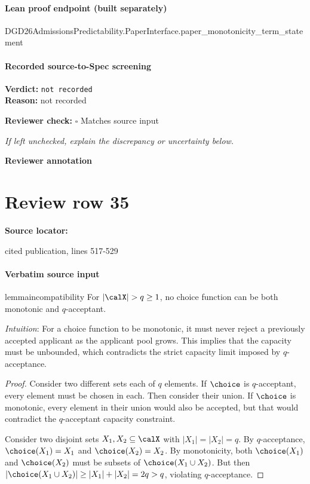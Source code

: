 \documentclass[10pt]{article}
\newcommand{\reviewerbox}{%
  \par\noindent\fbox{\parbox{0.96\linewidth}{\rule{0pt}{0.38in}}}\par
}
\newcommand{\reviewmatch}[1]{%
  \par\noindent\textbf{Reviewer check:} $\square$\; #1\par
  \noindent\emph{If left unchecked, explain the discrepancy or uncertainty below.}\par
}
\begin{document}
\paragraph{Lean proof endpoint (built separately)}\begin{ReviewVerbatim}
DGD26AdmissionsPredictability.PaperInterface.paper_monotonicity_term_statement
\end{ReviewVerbatim}

\paragraph{Recorded source-to-Spec screening}
\textbf{Verdict:} \texttt{not recorded}
\\
\textbf{Reason:} not recorded
\reviewmatch{Matches source input}
\noindent\textbf{Reviewer annotation}\par
\reviewerbox
\clearpage
\hypertarget{source-claim-43c4c9b7821d369a}{}
\section*{Review row 35}
\textbf{Source locator:} {\footnotesize\raggedright cited publication, lines 517-\allowbreak{}529\par}
\paragraph{Verbatim source input}
\begin{ReviewVerbatim}
\begin{restatable}{lemma}{incompatibility}
\label{thm:mono-accept-mutex}
For $|\calX| > q \geq 1$, no choice function can be both monotonic and $q$-acceptant.
\end{restatable}

\textit{Intuition}: %
For a choice function to be monotonic, it must never reject a previously accepted applicant as the applicant pool grows. This implies that the capacity must be unbounded, which contradicts the strict capacity limit imposed by $q$-acceptance.%

\begin{proof}
Consider two different sets each of $q$ elements. If $\choice$ is $q$-acceptant, every element must be chosen in each. Then consider their union. If $\choice$ is monotonic, every element in their union would also be accepted, but that would contradict the $q$-acceptant capacity constraint.

Consider two disjoint sets $X_1, X_2 \subseteq \calX$ with $|X_1| = |X_2| = q$. By $q$-acceptance, $\choice(X_1) = X_1$ and $\choice(X_2) = X_2$. By monotonicity, both $\choice(X_1)$ and $\choice(X_2)$ must be subsets of $\choice(X_1 \cup X_2)$. But then $|\choice(X_1 \cup X_2)| \geq |X_1| + |X_2| = 2q > q$, violating $q$-acceptance.
\end{proof}
\end{ReviewVerbatim}
\end{document}

